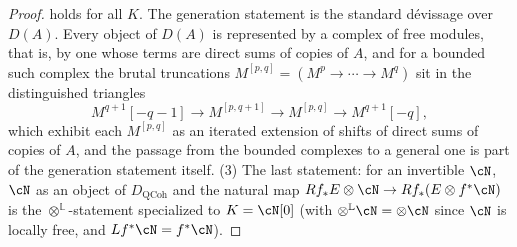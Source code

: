 \begin{proof}
holds for all $K$.  The generation statement is the standard dévissage
over $D(A)$.  Every object of $D(A)$ is represented by a complex of free
modules, that is, by one whose terms are direct sums of copies of $A$,
and for a bounded such complex the brutal truncations
$M^{[p,q]}=(M^p\to\cdots\to M^q)$ sit in the distinguished triangles
\[
M^{q+1}[-q-1]\to M^{[p,q+1]}\to M^{[p,q]}\to M^{q+1}[-q],
\]
which exhibit each $M^{[p,q]}$ as an iterated extension of shifts of
direct sums of copies of $A$, and the passage from the bounded complexes
to a general one is part of the generation statement itself.
(3) The last statement: for an invertible $\cN$,
$\cN$ as an object of $D_{\text{QCoh}}$ and the natural map
$Rf_*E\otimes\cN\to Rf_*(E\otimes f^*\cN)$ is the
$\otimes^{\mathbb L}$-statement specialized to $K=\cN[0]$ (with
$\otimes^{\mathbb L}\cN=\otimes\cN$ since $\cN$ is locally free, and
$Lf^*\cN=f^*\cN$).
\end{proof}


